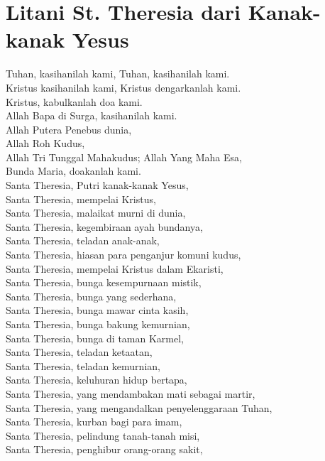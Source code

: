 \documentclass[12pt]{scrartcl}
\author{Yohanes Suyanto}
\begin{document}
\footnotesize
\section*{Litani St. Theresia dari Kanak-kanak Yesus}
Tuhan, kasihanilah kami, Tuhan, kasihanilah kami.\\
Kristus kasihanilah kami, Kristus dengarkanlah kami.\\
Kristus, kabulkanlah doa kami.\\
Allah Bapa di Surga, kasihanilah kami.\\
Allah Putera Penebus dunia,\\
Allah Roh Kudus,\\
Allah Tri Tunggal Mahakudus; Allah Yang Maha Esa,\\
Bunda Maria, doakanlah kami.\\
Santa Theresia, Putri kanak-kanak Yesus,\\
Santa Theresia, mempelai Kristus,\\
Santa Theresia, malaikat murni di dunia,\\
Santa Theresia, kegembiraan ayah bundanya,\\
Santa Theresia, teladan anak-anak,\\
Santa Theresia, hiasan para penganjur komuni kudus,\\
Santa Theresia, mempelai Kristus dalam Ekaristi,\\
Santa Theresia, bunga kesempurnaan mistik,\\
Santa Theresia, bunga yang sederhana,\\
Santa Theresia, bunga mawar cinta kasih,\\
Santa Theresia, bunga bakung kemurnian,\\
Santa Theresia, bunga di taman Karmel,\\
Santa Theresia, teladan ketaatan,\\
Santa Theresia, teladan kemurnian,\\
Santa Theresia, keluhuran hidup bertapa,\\
Santa Theresia, yang \scriptsize mendambakan \footnotesize  mati sebagai martir,\\
Santa Theresia, yang \scriptsize mengandalkan \footnotesize  penyelenggaraan  Tuhan,\\
Santa Theresia, kurban bagi para imam,\\
Santa Theresia, pelindung tanah-tanah misi,\\
Santa Theresia, penghibur orang-orang sakit,\\
\end{document}
